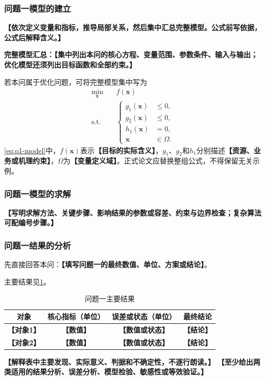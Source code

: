 \documentclass[UTF8,a4paper,12pt,zihao=-4]{ctexart}
\newcommand{\TemplateField}[1]{\textbf{【#1】}}
\begin{document}
\subsubsection{问题一模型的建立}
\TemplateField{依次定义变量和指标，推导局部关系，然后集中汇总完整模型。公式前写依据，公式后解释含义。}

\noindent\textbf{完整模型汇总：}\TemplateField{集中列出本问的核心方程、变量范围、参数条件、输入与输出；优化模型还须列出目标函数和全部约束。}

若本问属于优化问题，可将完整模型集中写为
\begin{equation}
\label{eq:q1-model}
\begin{aligned}
\min_{\symbf{x}}\quad & f(\symbf{x}) \\
\mathrm{s.t.}\quad &
\left\{
\begin{aligned}
g_1(\symbf{x}) &\leq 0,\\
g_2(\symbf{x}) &\leq 0,\\
h_1(\symbf{x}) &= 0,\\
\symbf{x} &\in \Omega .
\end{aligned}
\right.
\end{aligned}
\end{equation}
\cref{eq:q1-model}中，$f(\symbf{x})$表示\TemplateField{目标的实际含义}，$g_1$、$g_2$和$h_1$分别描述\TemplateField{资源、业务或机理约束}，$\Omega$为\TemplateField{变量定义域}。正式论文应替换整组公式，不得保留无关示例。

\subsubsection{问题一模型的求解}
\TemplateField{写明求解方法、关键步骤、影响结果的参数或容差、约束与边界检查；复杂算法可配编号步骤。}

\subsubsection{问题一结果的分析}
先直接回答本问：\textbf{【填写问题一的最终数值、单位、方案或结论】}。

主要结果见\cref{tab:q1-results}。
\begin{table}[htbp]
  \centering
  \caption{问题一主要结果}
  \label{tab:q1-results}
  \begin{tabular}{cccc}
    \toprule[1.2pt]
    对象 & 核心指标（单位） & 误差或状态（单位） & 最终结论 \\
    \midrule[0.8pt]
    \TemplateField{对象1} & \TemplateField{数值} & \TemplateField{数值或状态} & \TemplateField{结论} \\
    \TemplateField{对象2} & \TemplateField{数值} & \TemplateField{数值或状态} & \TemplateField{结论} \\
    \bottomrule[1.2pt]
  \end{tabular}
\end{table}
\TemplateField{解释表中主要发现、实际意义、判据和不确定性，不逐行朗读。}
\TemplateField{至少给出两类适用的结果分析、误差分析、模型检验、敏感性或等效验证。}
\end{document}
